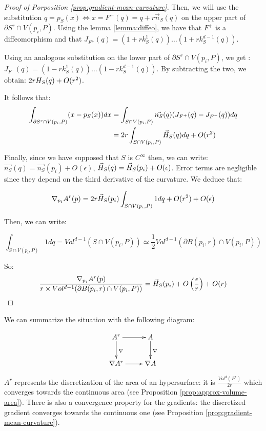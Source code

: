 \begin{proof}[Proof of Porposition \ref{prop:gradient-mean-curvature}]
Then, we will use the substitution $ q = p_S(x) \iff x = F^{+}(q) = q +
r \vec{n}_S(q) $ on the upper part of $ \partial{S^r} \cap V(p_i, P) $. Using
the lemma \ref{lemma:diffeo}, we have that $ F^{+} $ is a diffeomorphism and that
$ J_{F^+}(q) = (1 + r k^1_S(q)) \hdots (1 + r k^{d-1}_S(q)) $.

Using an analogous substitution on the lower part of $ \partial{S^r} \cap V(p_i,
P) $, we get : $ J_{F^-}(q) = (1 - r k^1_S(q)) \hdots (1 - r k^{d-1}_S(q)) $. By
subtracting the two, we obtain: $ 2 r H_{S}(q) + O(r^2) $.

It follows that:
\begin{align*}
    \int_{\partial{S^r} \cap V(p_i, P)} (x - p_S(x)) dx &= \int_{S \cap V(p_i, P)}
    \vec{n_S}(q) ( J_{F^+}(q) -J_{F^-}(q) ) dq \\
    &= 2r \int_{S \cap V(p_i, P)} \vec{H}_{S}(q) dq + O(r^2) \\
\end{align*}

Finally, since we have supposed that $ S $ is $ C^{\infty} $ then, we can write:
$ \vec{n_S}(q) = \vec{n_S}(p_i) + O(\epsilon) $, $ \vec{H}_{S}(q) = \vec{H}_{S}(p_i)
+ O(\epsilon) $. Error terms are negligible since they depend on the third derivative
of the curvature. We deduce that:

$$ \nabla_{p_i} A^r(p) = 2r \vec{H}_{S}(p_i) \int_{S \cap V(p_i, P)} 1 dq + O(r^2)
+ O(\epsilon) $$

Then, we can write:

$$ \int_{S \cap V(p_i, P)} 1 dq = Vol^{d-1}(S\cap V(p_i,P)) \simeq \frac{1}{2}
    Vol^{d-1}(\partial B(p_i,r) \cap V(p_i,P)) $$

So:
\begin{equation*}
    \frac{\nabla_{p_i} A^r(p)}{r \times Vol^{d-1}(\partial B(p_i,r) \cap V(p_i,P))}
    = \vec{H}_{S}(p_i) + O \left(\frac{\epsilon}{r}\right) + O(r) \qedhere
\end{equation*}

\end{proof}

We can summarize the situation with the following diagram:

\begin{displaymath}
    \xymatrix{A^r \ar[d]^{\nabla} \ar[r] & A \ar[d]^{\nabla} \\
        \nabla A^r \ar[r] & \nabla A }
\end{displaymath}

$ A^r $ represents the discretization of the area of an hypersurface: it
is $ \frac{Vol^d(P^r)}{2r} $ which converges towards the continuous area (see
Proposition \ref{prop:approx-volume-area}). There is also a convergence property
for the gradients: the discretized gradient converges towards the continuous one
(see Proposition \ref{prop:gradient-mean-curvature}).

